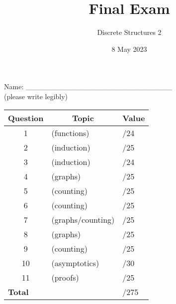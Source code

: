\documentclass[11pt, oneside]{article}   	%
\title{Final Exam}
\author{Discrete Structures 2}
\date{8 May 2023}							%
\begin{document}
\maketitle
\begin{center}
Name: \_\_\_\_\_\_\_\_\_\_\_\_\_\_\_\_\_\_\_\_\_\_\_\_\_\_\_\_ \\(please write legibly) 
\end{center}

\begin{center}
\begin{tabular}{|c|l|l|}
\hline
\textbf{Question} & \multicolumn{1}{|c|}{\textbf{Topic}} & \multicolumn{1}{|c|}{\textbf{Value}}\\
\hline
\hline
1 & (functions) & \hspace{3em}/24\\ \hline
2 & (induction) & \hspace{3em}/25\\ \hline
3 & (induction) & \hspace{3em}/24\\ \hline
4 & (graphs) & \hspace{3em}/25\\ \hline
5 & (counting) &  \hspace{3em}/25\\ \hline
6 & (counting) & \hspace{3em}/25\\ \hline
7 & (graphs/counting) & \hspace{3em}/25\\ \hline
8 & (graphs) & \hspace{3em}/25\\ \hline
9 & (counting) & \hspace{3em}/25\\ \hline
10 & (asymptotics) & \hspace{3em}/30\\ \hline
11 & (proofs) & \hspace{3em}/25\\ \hline
 \hline
\hline
\multicolumn{2}{|l|}{\textbf{Total}} & \hspace{4em}/275\\
\hline
\end{tabular}
\end{center}
\end{document}
